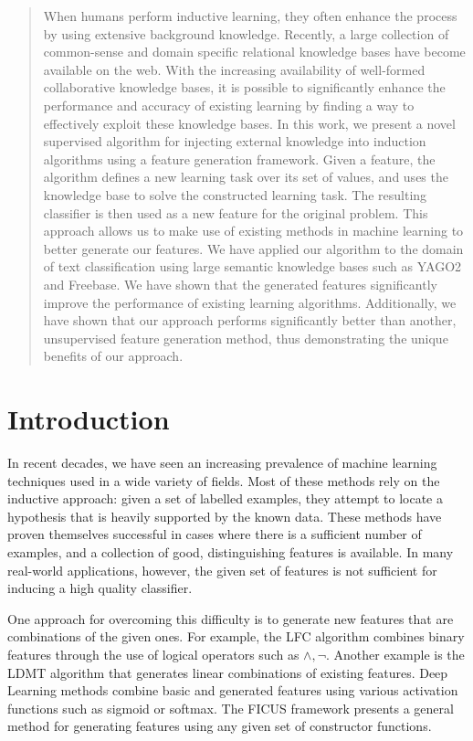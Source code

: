 \documentclass[twoside,11pt]{article}
\theoremstyle{definition}
\begin{document}
\begin{abstract}
	When humans perform inductive learning, they often enhance the process by using extensive background knowledge.
	 Recently, a large collection of common-sense and domain specific relational knowledge bases have become available on the web.
	With the increasing availability of well-formed collaborative knowledge bases, it is possible to significantly enhance the performance and accuracy of existing learning by finding a way to effectively exploit these knowledge bases. 
	In this work, we present a novel supervised algorithm for injecting external knowledge into induction algorithms using a feature generation framework. Given a feature, the algorithm defines a new learning task over its set of values, and uses the knowledge base to solve the constructed learning task. The resulting classifier is then used as a new feature for the original problem.
	This approach allows us to make use of existing methods in machine learning to better generate our features.
	We have applied our algorithm to the domain of text classification using large semantic knowledge bases such as YAGO2 and Freebase. We have shown that the generated features significantly improve the performance of existing learning algorithms.
	Additionally, we have shown that our approach performs significantly better than another, unsupervised feature generation method, thus demonstrating the unique benefits of our approach.
\end{abstract}

\clearpage
{}


\section{Introduction}
\label{sec:Intro}
In recent decades, we have seen an increasing prevalence of machine learning techniques used in a wide variety of fields. %
Most of these methods rely on the inductive approach: given a set of labelled examples, they attempt to locate a hypothesis that is heavily supported by the known data. These methods have proven themselves successful in cases where there is a sufficient number of examples, and a collection of good,
distinguishing features is available.
In many real-world applications, however, the given set of features is not sufficient for inducing a high quality classifier.

One approach for overcoming this difficulty is to generate new features that are combinations of the given ones.
For example, the LFC algorithm  combines binary features through the use of logical operators such as $\land ,\lnot$.
Another example is the LDMT algorithm \cite{utgo1991linear} that generates linear combinations of existing features.
Deep Learning methods combine basic and generated features using various activation functions such as sigmoid or softmax.
The FICUS framework \cite{markovitch2002feature} presents a general method for generating features using any given set of constructor functions.
\end{document}
